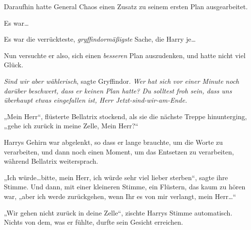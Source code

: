 Daraufhin hatte General Chaos einen Zusatz zu seinem ersten Plan ausgearbeitet.

Es war…

Es war die verrückteste, \emph{gryffindormäßigste} Sache, die Harry je…

Nun versuchte er also, sich einen \emph{besseren} Plan auszudenken, und hatte nicht viel Glück.

\emph{Sind wir aber wählerisch}, sagte Gryffindor. \emph{Wer} \emph{hat sich} \emph{vor einer Minute} \emph{noch} \emph{darüber} \emph{beschwert, dass er keinen Plan hatte? Du solltest froh sein, dass uns überhaupt etwas eingefallen ist, Herr Jetzt-sind-wir-am-Ende.}

„Mein Herr“, flüsterte Bellatrix stockend, als sie die nächste Treppe hinunterging, „gehe ich zurück in meine Zelle, Mein Herr?“

Harrys Gehirn war abgelenkt, so dass er lange brauchte, um die Worte zu verarbeiten, und dann noch einen Moment, um das Entsetzen zu verarbeiten, während Bellatrix weitersprach.

„Ich würde…bitte, mein Herr, ich würde sehr viel lieber sterben“, sagte ihre Stimme. Und dann, mit einer kleineren Stimme, ein Flüstern, das kaum zu hören war, „aber ich werde zurückgehen, wenn Ihr es von mir verlangt, mein Herr…“

„Wir gehen nicht zurück in deine Zelle“, zischte Harrys Stimme automatisch. Nichts von dem, was er fühlte, durfte sein Gesicht erreichen.

